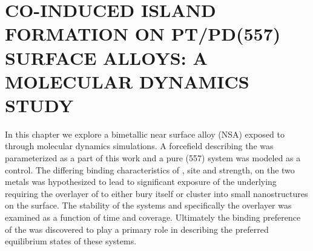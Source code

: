 
\chapter{CO-INDUCED ISLAND FORMATION ON PT/PD(557) SURFACE ALLOYS: A MOLECULAR DYNAMICS STUDY}
\label{chap:island}




In this chapter we explore a bimetallic  near surface alloy (NSA)
exposed to  through molecular dynamics simulations. A forcefield
describing the  was parameterized as a part of this work and
a pure  (557) system was modeled as a control. The differing binding
characteristics of , site and strength, on the two metals was
hypothesized to lead to significant exposure of the underlying 
requiring the overlayer of  to either bury itself or cluster into small
nanostructures on the surface. The stability of the systems and specifically
the  overlayer was examined as a function of time and  coverage.
Ultimately the binding preference of the  was discovered to play a
primary role in describing the preferred equilibrium states of these systems.



